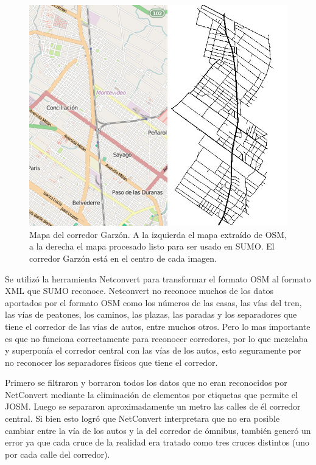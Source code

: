 \begin{figure}[H]
	\centering
	\includegraphics[width=0.9\linewidth]{Figures/mapa_osm_sumo}
	\caption[Mapa del corredor Garzón]{Mapa del corredor Garzón. A la izquierda el mapa extraído de OSM, a la derecha el mapa procesado listo para ser usado en SUMO. El corredor Garzón está en el centro de cada imagen.}
	\label{fig:mapa_osm_sumo}
\end{figure}

Se utilizó la herramienta Netconvert para transformar el formato OSM al formato XML que SUMO reconoce. Netconvert no reconoce muchos de los datos aportados por el formato OSM como los números de las casas, las vías del tren, las vías de peatones, los caminos, las plazas, las paradas y los separadores que tiene el corredor de las vías de autos, entre muchos otros. Pero lo mas importante es que no funciona correctamente para reconocer corredores, por lo que mezclaba y superponía el corredor central con las vías de los autos, esto seguramente por no reconocer los separadores físicos que tiene el corredor. 

Primero se filtraron y borraron todos los datos que no eran reconocidos por NetConvert mediante la eliminación de elementos por etiquetas que permite el 
JOSM. Luego se separaron aproximadamente un metro las calles de él corredor central. Si bien esto logró que NetConvert interpretara que no era posible cambiar entre la vía de los autos y la del corredor de ómnibus, también generó un error ya que cada cruce de la realidad era tratado como tres cruces distintos (uno por cada calle del corredor).

